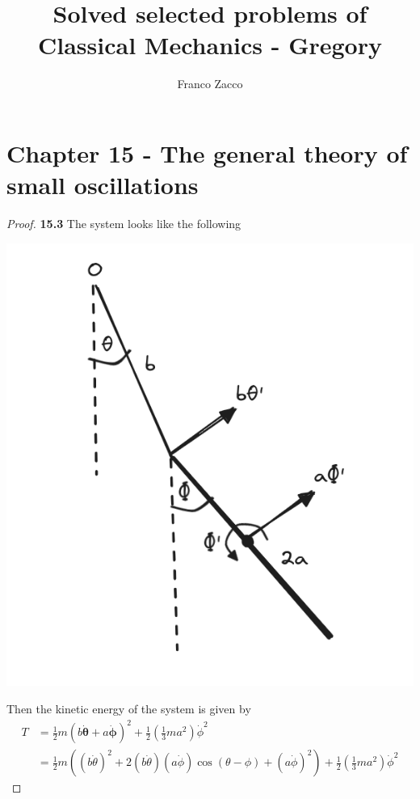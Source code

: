 \documentclass[11pt]{article}
\title{\textbf{Solved selected problems of Classical Mechanics - Gregory}}
\author{Franco Zacco}
\date{}
\theoremstyle{definition}
\begin{document}
\maketitle
\thispagestyle{empty}

\section*{Chapter 15 - The general theory of small oscillations}

\begin{proof}{\textbf{15.3}}
    The system looks like the following
    \begin{center}
        \includegraphics[scale=0.4]{ch15-3.png}
    \end{center}
    Then the kinetic energy of the system is given by
    \begin{align*}
        T &= \frac{1}{2}m(b\bm{\dot\theta} + a\bm{\dot\phi})^2
        + \frac{1}{2}\left(\frac{1}{3}ma^2\right)\dot\phi^2\\
        &= \frac{1}{2}m\left((b\dot\theta)^2
        + 2(b\dot\theta)(a\dot\phi)\cos(\theta-\phi) + (a\dot\phi)^2\right)
        + \frac{1}{2}\left(\frac{1}{3}ma^2\right)\dot\phi^2
    \end{align*}

\end{proof}
\end{document}

